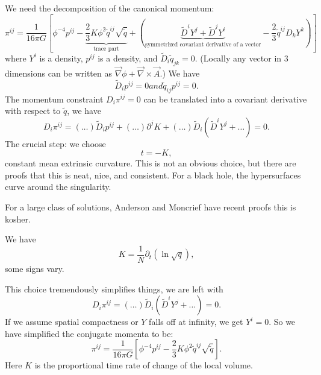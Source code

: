 We need the decomposition of the canonical momentum:
\begin{equation}
\pi^{ij} = \frac{1}{16\pi G}[\phi^{-4}p^{ij} -
  \underbrace{\frac{2}{3}K\phi^{2}\widetilde{q}^{ij}\sqrt{\widetilde{q}}}_{\text{trace part}}
  + (\underbrace{\widetilde{D}^{i}Y^{j} + \widetilde{D}^{j}Y^{i}}_{\text{symmetrized covariant derivative of a vector}}
  -\frac{2}{3}\widetilde{q}^{ij}D_{k}Y^{k})]
\end{equation}
where $Y^{i}$ is a density, $p^{ij}$ is a density, and $\widetilde{D}_{i}\widetilde{q}_{jk}=0$.
(Locally any vector
in 3 dimensions can be written as $\vec{\nabla}\phi + \vec{\nabla}\times\vec{A}$.)
We have
\begin{subequations}
\begin{equation}
\widetilde{D}_{i}p^{ij} = 0
\end{equation}
and
\begin{equation}
\widetilde{q}_{ij}p^{ij}=0.
\end{equation}
\end{subequations}
The momentum constraint $D_{i}\pi^{ij}=0$ can be translated into a
covariant derivative with respect to $\widetilde{q}$, we have
\begin{equation}
D_{i}\pi^{ij} = (\dots)\widetilde{D}_{i}p^{ij} + (\dots)\partial^{j}K + (\dots)\widetilde{D}_{i}(\widetilde{D}^{i}Y^{j}+\dots)=0.
\end{equation}
%
The crucial step: we choose
\begin{equation}
t = -K,
\end{equation}
constant mean extrinsic curvature. This is not an obvious choice, but
there are proofs that this is neat, nice, and consistent. For a black
hole, the hypersurfaces curve around the singularity.

For a large class of solutions, Anderson and Moncrief have recent proofs
this is kosher.

We have
\begin{equation}
K = \frac{1}{N}\partial_{t}(\ln\sqrt{q}),
\end{equation}
some signs vary.

This choice tremendously simplifies things, we are left with
\begin{equation}
D_{i}\pi^{ij} = (\dots)\widetilde{D}_{i}(\widetilde{D}^{i}Y^{j}+\dots) = 0.
\end{equation}
If we assume spatial compactness or $Y$ falls off at infinity, we get
$Y^{i}=0$. So we have simplified the conjugate momenta to be:
\begin{equation}
\pi^{ij} = \frac{1}{16\pi G}[\phi^{-4}p^{ij} - \frac{2}{3}K\phi^{2}\widetilde{q}^{ij}\sqrt{\widetilde{q}}].
\end{equation}
Here $K$ is the proportional time rate of change of the local volume.


